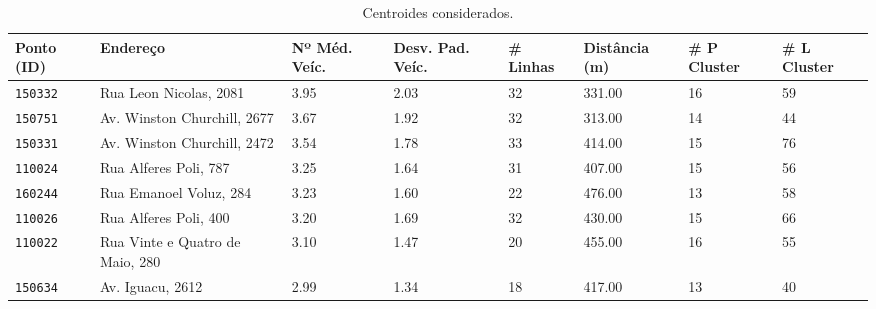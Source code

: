 


\begin{table}[htb]
    \caption{Centroides considerados.}
    \label{tab:regioes-servico}
    \centering
    \footnotesize
    \begin{tabular} {p{1.5cm}p{4.0cm}p{1.5cm}p{1.5cm}p{1.5cm}p{1.5cm}p{1.5cm}p{1.5cm} }  %
        \hline
        Ponto (ID) & Endereço &Nº Méd. Veíc. & Desv. Pad. Veíc. &\# Linhas &Distância (m) & \# P Cluster &\# L Cluster  \\
        \hline
    \texttt{150332} &                       Rua Leon Nicolas, 2081  &              3.95 &                   2.03 &       32 &        331.00 &          16 &          59 \\
    \texttt{150751} &                  Av. Winston Churchill, 2677  &              3.67 &                   1.92 &       32 &        313.00 &          14 &          44 \\
    \texttt{150331} &                  Av. Winston Churchill, 2472  &              3.54 &                   1.78 &       33 &        414.00 &          15 &          76 \\
    \texttt{110024} &                        Rua Alferes Poli, 787  &              3.25 &                   1.64 &       31 &        407.00 &          15 &          56 \\
    \texttt{160244} &                       Rua Emanoel Voluz, 284  &              3.23 &                   1.60 &       22 &        476.00 &          13 &          58 \\
    \texttt{110026} &                        Rua Alferes Poli, 400  &              3.20 &                   1.69 &       32 &        430.00 &          15 &          66 \\
    \texttt{110022} &               Rua Vinte e Quatro de Maio, 280 &              3.10 &                   1.47 &       20 &        455.00 &          16 &          55 \\
    \texttt{150634} &                             Av. Iguacu, 2612  &              2.99 &                   1.34 &       18 &        417.00 &          13 &          40 \\

\end{tabular}
\end{table}
